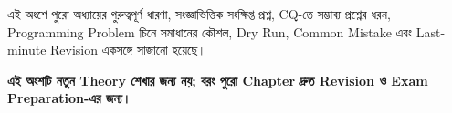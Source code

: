 
এই অংশে পুরো অধ্যায়ের গুরুত্বপূর্ণ ধারণা, সংজ্ঞাভিত্তিক সংক্ষিপ্ত প্রশ্ন,
CQ-তে সম্ভাব্য প্রশ্নের ধরন, Programming Problem চিনে সমাধানের কৌশল,
Dry Run, Common Mistake এবং Last-minute Revision একসঙ্গে সাজানো হয়েছে।

\begin{rememberbox}

\begin{center}
\textbf{এই অংশটি নতুন Theory শেখার জন্য নয়; বরং পুরো Chapter দ্রুত Revision ও Exam Preparation-এর জন্য।}
\end{center}

\end{rememberbox}


